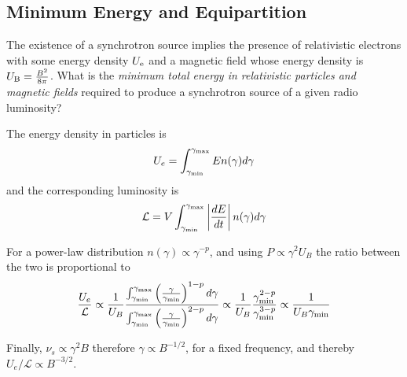 
\subsection{Minimum Energy and Equipartition}

The existence of a synchrotron source implies the presence of relativistic electrons with some energy density $U_{\rm e}$ and a magnetic field whose energy density is $U_{\rm B} = \frac{B^2}{8\pi}$. 
%
What is the \emph{minimum total energy in relativistic particles and magnetic fields} required to produce a synchrotron source of a given radio luminosity?

The energy density in particles is
%
\[
U_e = \int_{\gamma_{\rm min}}^{\gamma_{\rm max}} E n(\gamma) d\gamma
\]
%
and the corresponding luminosity is
%
\[
\mathcal L = V \int_{\gamma_{\rm min}}^{\gamma_{\rm max}} \left| \frac{dE}{dt} \right| n(\gamma) d\gamma
\]

For a power-law distribution $n(\gamma) \propto \gamma^{-p}$, and using $P \propto \gamma^2 U_B$ the ratio between the two is proportional to
%
\begin{equation*}
\frac{U_e}{\mathcal L} \propto \frac{1}{U_B} \frac{\int_{\gamma_{\rm min}}^{\gamma_{\rm max}} \left( \frac{\gamma}{\gamma_{\rm min}}\right)^{1-p} d\gamma}{\int_{\gamma_{\rm min}}^{\gamma_{\rm max}}  \left( \frac{\gamma}{\gamma_{\rm min}}\right)^{2-p}  d\gamma} \propto \frac{1}{U_B} \frac{\gamma_{\rm min}^{2-p}}{\gamma_{\rm min}^{3-p}} \propto \frac{1}{U_B \gamma_{\rm min}}
\end{equation*}	

Finally, $\nu_s \propto \gamma^2 B$ therefore $\gamma \propto B^{-1/2}$, for a fixed frequency, and thereby $U_e / \mathcal L \propto B^{-3/2}$.  

